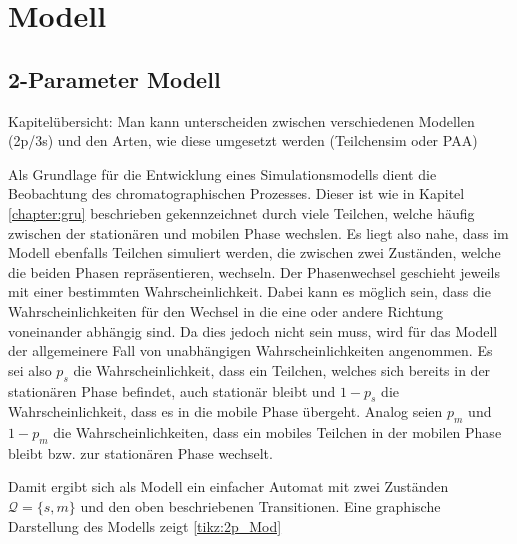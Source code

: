 \chapter{Modell} %
\label{chapter:mod}

\section{2-Parameter Modell}

Kapitelübersicht: Man kann unterscheiden zwischen verschiedenen Modellen (2p/3s) und den Arten, wie diese umgesetzt werden (Teilchensim oder PAA)

Als Grundlage für die Entwicklung eines Simulationsmodells dient die Beobachtung des chromatographischen Prozesses. Dieser ist wie in Kapitel \ref{chapter:gru} beschrieben gekennzeichnet durch viele Teilchen, welche häufig zwischen der stationären und mobilen Phase wechslen. Es liegt also nahe, dass im Modell ebenfalls Teilchen simuliert werden, die zwischen zwei Zuständen, welche die beiden Phasen repräsentieren, wechseln. Der Phasenwechsel geschieht jeweils mit einer bestimmten Wahrscheinlichkeit. Dabei kann es möglich sein, dass die Wahrscheinlichkeiten für den Wechsel in die eine oder andere Richtung voneinander abhängig sind. Da dies jedoch nicht sein muss, wird für das Modell der allgemeinere Fall von unabhängigen Wahrscheinlichkeiten angenommen. Es sei also $p_s$ die Wahrscheinlichkeit, dass ein Teilchen, welches sich bereits in der stationären Phase befindet, auch stationär bleibt und $1-p_s$ die Wahrscheinlichkeit, dass es in die mobile Phase übergeht. Analog seien $p_m$ und $1-p_m$ die Wahrscheinlichkeiten, dass ein mobiles Teilchen in der mobilen Phase bleibt bzw. zur stationären Phase wechselt. 


Damit ergibt sich als Modell ein einfacher Automat mit zwei Zuständen $\mathcal{Q} = \{s, m\}$ und den oben beschriebenen Transitionen. Eine graphische Darstellung des Modells zeigt \ref{tikz:2p_Mod} 

